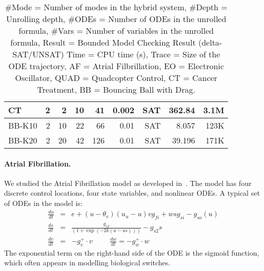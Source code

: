 {\begin{table}[!th]
\begin{tabular}{l|r|r|r|r|r|r|r|r}
    CT       & 2   & 2         & 10      & 41      & 0.002     & SAT & 362.84 & 3.1M\\
    \hline
    \hline
    BB-K10 & 2     & 10       & 22     & 66      & 0.01        & SAT & 8.057     & 123K  \\
    BB-K20 & 2     & 20       & 42     & 126     & 0.01        & SAT & 39.196    & 171K  \\
    \hline
    \hline
  \end{tabular}
  \caption{\small
    \#Mode = Number of modes in the hybrid system,
    \#Depth = Unrolling depth,
    \#ODEs = Number of ODEs in the unrolled formula,
    \#Vars = Number of variables in the unrolled formula,
    Result = Bounded Model Checking Result (delta-SAT/UNSAT)
    Time = CPU time (s),
    Trace = Size of the ODE trajectory,
    AF = Atrial Filbrillation,
    EO = Electronic Oscillator,
    QUAD = Quadcopter Control,
    CT = Cancer Treatment,
    BB = Bouncing Ball with Drag.
}\label{tbl:exp}
\end{table}

\paragraph{Atrial Fibrillation.} We studied the Atrial Fibrillation model as developed in~\cite{DBLP:conf/cav/GrosuBFGGSB11}. The model has four discrete control locations, four state variables, and nonlinear ODEs. A typical set of ODEs in the model is:
\begin{eqnarray*}
\frac{du}{dt} &=& e + (u-\theta_v)(u_u-u ) v g_{fi} + wsg_{si}-g_{so}(u)\\
\frac{ds}{dt} &=& \displaystyle\frac{g_{s2}}{(1+\exp(-2k(u-us)))} -  g_{s2}s\\
\frac{dv}{dt} &=& -g_v^+\cdot v \hspace{1cm} \frac{dw}{dt} = -g_w^+\cdot w
\end{eqnarray*}
The exponential term on the right-hand side of the ODE is the sigmoid function, which often appears in modelling biological switches.
}
